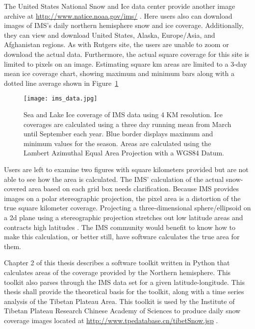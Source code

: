 The United States National Snow and Ice data center provide another image archive at \url{http://www.natice.noaa.gov/ims/} \cite{nat_ice}. Here users also can download images of IMS’s daily northern hemisphere snow and ice coverage. Additionally, they can view and download United States, Alaska, Europe/Asia, and Afghanistan regions. As with Rutgers site, the users are unable to zoom or download the actual data. Furthermore, the actual square coverage for this site is limited to pixels on an image. Estimating square km areas are limited to a 3-day mean ice coverage chart, showing maximum and minimum bars along with a dotted line average shown in Figure~\ref{fig:nat_ice}

\begin{figure}[ht]
  \centering
  \begin{minipage}{4.5in}
    \texttt{[image: ims\_data.jpg]}
    \caption{ \label{fig:nat_ice} Sea and Lake Ice coverage of IMS data using 4 KM resolution. Ice coverages are calculated using a three day running mean from March until September each year. Blue border displays maximum and minimum values for the season. Areas are calculated using the Lambert Azimuthal Equal Area Projection with a WGS84 Datum. \cite{nat_ice}}
  \end{minipage}
\end{figure}

Users are left to examine two figures with square kilometers provided but are not able to see how the area is calculated. The IMS' calculation of the actual snow-covered area based on each grid box needs clarification. Because IMS provides images on a polar stereographic projection, the pixel area is a distortion of the true square kilometer coverage. Projecting a three-dimensional sphere/ellipsoid on a 2d plane using a stereographic projection stretches out low latitude areas and contracts high latitudes \cite{snyder1987map}. The IMS community would benefit to know how to make this calculation, or better still, have software calculates the true area for them.

Chapter 2 of this thesis describes a software toolkit written in Python that calculates areas of the coverage provided by the Northern hemisphere. This toolkit also parses through the IMS data set for a given latitude-longitude. This thesis shall provide the theoretical basis for the toolkit, along with a time series analysis of the Tibetan Plateau Area. This toolkit is used by the Institute of Tibetan Plateau Research Chinese Academy of Sciences to produce daily snow coverage images located at \url{http://www.tpedatabase.cn/tibetSnow.jsp} \cite{TP_database}. 


